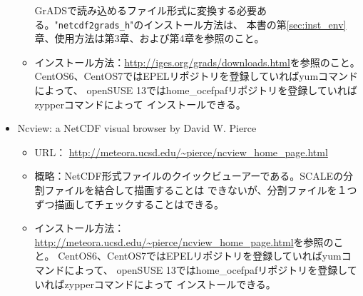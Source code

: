 \begin{itemize}
\begin{itemize}
             GrADSで読み込めるファイル形式に変換する必要ある。"\verb|netcdf2grads_h|"のインストール方法は、
本書の第\ref{sec:inst_env}章、使用方法は第3章、および第4章を参照のこと。
  \item インストール方法：\url{http://iges.org/grads/downloads.html}を参照のこと。
                        CentOS6、CentOS7ではEPELリポジトリを登録していればyumコマンドによって、
                        openSUSE 13ではhome\_ocefpafリポジトリを登録していればzypperコマンドによって
                        インストールできる。
 \end{itemize}
\item Ncview: a NetCDF visual browser by David W. Pierce\\
 \begin{itemize}
  \item URL： \url{http://meteora.ucsd.edu/~pierce/ncview_home_page.html}
  \item 概略：NetCDF形式ファイルのクイックビューアーである。SCALEの分割ファイルを結合して描画することは
             できないが、分割ファイルを１つずつ描画してチェックすることはできる。
  \item インストール方法：\url{http://meteora.ucsd.edu/~pierce/ncview_home_page.html}を参照のこと。
                        CentOS6、CentOS7ではEPELリポジトリを登録していればyumコマンドによって、
                        openSUSE 13ではhome\_ocefpafリポジトリを登録していればzypperコマンドによって
                        インストールできる。
 \end{itemize}
\end{itemize}





